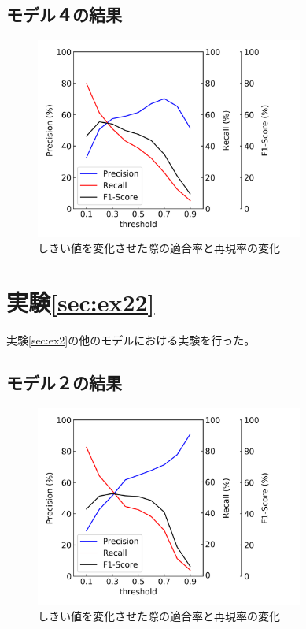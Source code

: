 \subsection{モデル４の結果}
\begin{figure}[htbp]
    \begin{center}
        \includegraphics[width=88mm]{./fig/densenet161_ethreshold.png}
        \caption{しきい値を変化させた際の適合率と再現率の変化}
        \label{fig:densenet161_e_result_threshold}
    \end{center}
\end{figure}

\newpage
\section{実験\ref{sec:ex22}}
実験\ref{sec:ex2}の他のモデルにおける実験を行った。

\subsection{モデル２の結果}
\begin{figure}[htbp]
    \begin{center}
        \includegraphics[width=88mm]{./fig/resnet3d_ethreshold.png}
        \caption{しきい値を変化させた際の適合率と再現率の変化}
        \label{figresnet3d_e_result_threshold}
    \end{center}
\end{figure}

